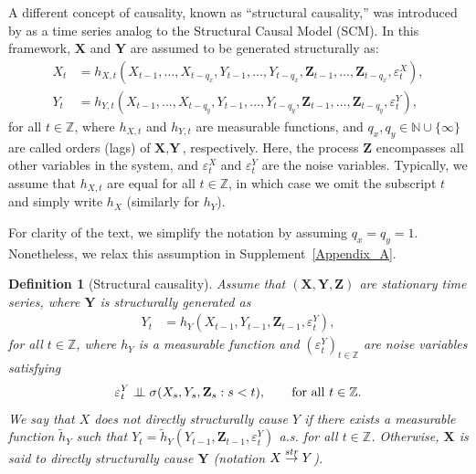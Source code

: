 \documentclass[a4paper,11pt]{article}
\newtheorem{definition}{Definition}
\newcommand{\indep}{\perp\kern-5.5pt\perp}
\newcommand{\toverset}[2]{\overset{{\rm #1}}{#2}}
\begin{document}
A different concept of causality, known as ``structural causality,'' was introduced by \cite{white2010granger} as a time series analog to the Structural Causal Model (SCM). In this framework, $\textbf{X}$ and $\textbf{Y}$ are assumed to be generated structurally as:
\begin{equation}\label{structural_generation_lag}
\begin{split}
    X_t&=h_{X,t}(X_{t-1}, \dots, X_{t-q_x}, Y_{t-1}, \dots, Y_{t-q_x}, \textbf{Z}_{t-1}, \dots, \textbf{Z}_{t-q_x}, \varepsilon^X_t),\\
    Y_t&=h_{Y,t}(X_{t-1}, \dots, X_{t-q_y}, Y_{t-1}, \dots, Y_{t-q_y}, \textbf{Z}_{t-1}, \dots, \textbf{Z}_{t-q_y}, \varepsilon^Y_t),
\end{split}
\end{equation}
for all $t\in\mathbb{Z}$, where $h_{X,t}$ and $h_{Y,t}$ are measurable functions, and $q_x, q_y\in\mathbb{N}\cup\{\infty\}$ are called orders (lags) of $\textbf{X},\textbf{Y}$, respectively. Here, the process $\textbf{Z}$ encompasses all other variables in the system, and $\varepsilon^X_t$ and $\varepsilon^Y_t$ are the noise variables. Typically, we assume that $h_{X,t}$ are equal for all $t\in\mathbb{Z}$, in which case we omit the subscript $t$ and simply write $h_X$ (similarly for $h_Y$).
 
For clarity of the text, we simplify the notation by assuming $q_x=q_y=1$. Nonetheless, we relax this assumption in Supplement~\ref{Appendix_A}. 

\begin{definition}[Structural causality]\label{Definition_str}
Assume that $(\textbf{X},\textbf{Y}, \textbf{Z})$ are stationary time series, where $\textbf{Y}$ is structurally generated as 
\begin{equation*}%
\begin{split}
    Y_t&=h_{Y}(X_{t-1}, Y_{t-1}, \textbf{Z}_{t-1}, \varepsilon^Y_t),
\end{split}
\end{equation*}
for all $t\in\mathbb{Z}$, where \(h_Y\) is a measurable function and \((\varepsilon_t^Y)_{t\in\mathbb Z}\) are noise variables satisfying 
\begin{equation}\label{IndependenceOfNoise}
\varepsilon_t^Y
    \indep
    \sigma(X_s,Y_s,\mathbf Z_s:s<t),
    \qquad \text{for all }t\in\mathbb Z.    
\end{equation} 
We say that \(X\) does \textit{not} directly structurally cause \(Y\) if there exists a measurable
function \(\widetilde h_Y\) such that \(
    Y_t=\widetilde h_Y(Y_{t-1},\mathbf Z_{t-1},\varepsilon_t^Y)
\) a.s. for all $t\in\mathbb{Z}$. 
Otherwise, $\textbf{X}$ is said to directly structurally cause $\textbf{Y}$ (notation $\textbf{X}\toverset{str}{\to}\textbf{Y}$). 
\end{definition}
\end{document}
